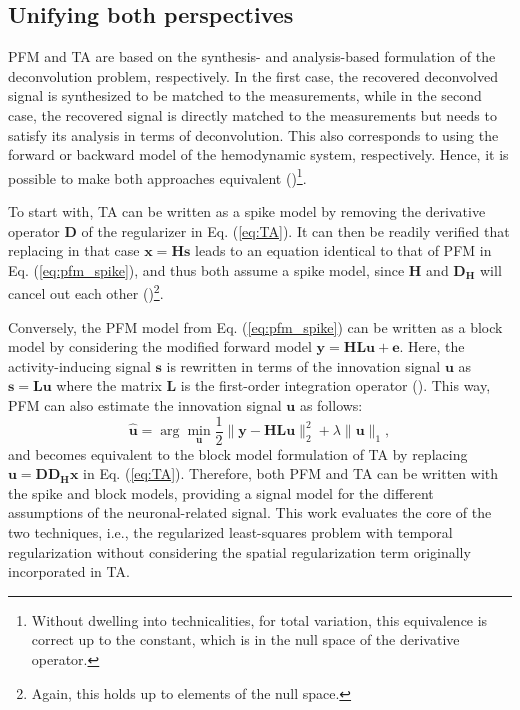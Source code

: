 \subsection{Unifying both perspectives}

PFM and TA are based on the synthesis- and analysis-based formulation of the deconvolution problem, respectively. In the first case, the recovered deconvolved signal is synthesized to be matched to the measurements, while in the second case, the recovered signal is directly matched to the measurements but needs to satisfy its analysis in terms of deconvolution. This also corresponds to using the forward or backward model of the hemodynamic system, respectively. Hence, it is possible to make both approaches equivalent (\citealt{Elad2007Analysisversussynthesis})\footnote{Without dwelling into technicalities, for total variation, this equivalence is correct up to the constant, which is in the null space of the derivative operator.}.

To start with, TA can be written as a spike model by removing the derivative operator $\mathbf{D}$ of the regularizer in Eq. (\ref{eq:TA}). It can then be readily verified that replacing in that case $\mathbf{x}=\mathbf{Hs}$ leads to an equation identical to that of PFM in Eq. (\ref{eq:pfm_spike}), and thus both assume a spike model, since $\mathbf{H}$ and $\mathbf{D_H}$ will cancel out each other (\citealt{Karahanoglu2011SignalProcessingApproach})\footnote{Again, this holds up to elements of the null space.}.

Conversely, the PFM model from Eq. (\ref{eq:pfm_spike}) can be written as a block model by considering the modified forward model $\mathbf{y} = \mathbf{H L u} + \mathbf{e}$. Here, the activity-inducing signal $\mathbf{s}$ is rewritten in terms of the innovation signal $\mathbf{u}$ as $\mathbf{s}=\mathbf{Lu}$ where the matrix $\mathbf{L}$ is the first-order integration operator (\citealt{Cherkaoui2019SparsitybasedBlind,Urunuela2020StabilityBasedSparse}). This way, PFM can also estimate the innovation signal $\mathbf{u}$ as follows: 
\begin{equation}
    \label{eq:pfm_block}
    \hat{\mathbf{u}} = \arg \min_{\mathbf{u}} \frac{1}{2} \| \mathbf{y} - \mathbf{HLu} \|_2^2 + \lambda \| \mathbf{u} \|_1,
\end{equation}
and becomes equivalent to the block model formulation of TA by replacing $\mathbf{u}=\mathbf{D D_H x}$ in Eq. (\ref{eq:TA}). Therefore, both PFM and TA can be written with the spike and block models, providing a signal model for the different assumptions of the neuronal-related signal. This work evaluates the core of the two techniques, i.e., the regularized least-squares problem with temporal regularization without considering the spatial regularization term originally incorporated in TA.

